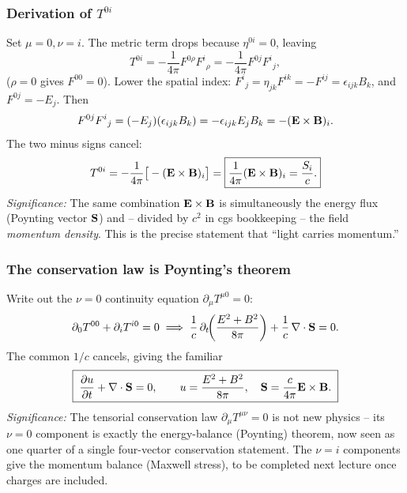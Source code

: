 
\subsubsection*{Derivation of $T^{0i}$}
Set $\mu=0,\nu=i$. The metric term drops because $\eta^{0i}=0$, leaving
\begin{equation}\label{eq:lec23:T0i-step1}
  T^{0i}=-\frac{1}{4\pi}F^{0\rho}F^{i}{}_{\rho}
        =-\frac{1}{4\pi}F^{0j}F^{i}{}_{j},
\end{equation}
($\rho=0$ gives $F^{00}=0$). Lower the spatial index:
$F^{i}{}_{j}=\eta_{jk}F^{ik}=-F^{ij}=\epsilon_{ijk}B_k$, and $F^{0j}=-E_j$. Then
\begin{equation}\label{eq:lec23:T0i-step2}
  F^{0j}F^{i}{}_{j}=(-E_j)(\epsilon_{ijk}B_k)
                  =-\epsilon_{ijk}E_jB_k=-(\mathbf{E}\times\mathbf{B})_i .
\end{equation}
The two minus signs cancel:
\begin{equation}\label{eq:lec23:T0i-final}
  T^{0i}=-\frac{1}{4\pi}\big[-(\mathbf{E}\times\mathbf{B})_i\big]
        =\boxed{\frac{1}{4\pi}(\mathbf{E}\times\mathbf{B})_i=\frac{S_i}{c}.}
\end{equation}
\textit{Significance:} The same combination $\mathbf{E}\times\mathbf{B}$ is simultaneously the energy
flux (Poynting vector $\mathbf{S}$) and -- divided by $c^2$ in cgs bookkeeping -- the field
\emph{momentum density}. This is the precise statement that ``light carries momentum.''

\subsubsection*{The conservation law is Poynting's theorem}
Write out the $\nu=0$ continuity equation $\partial_\mu T^{\mu0}=0$:
\begin{equation}\label{eq:lec23:poynting-thm}
  \partial_0 T^{00}+\partial_i T^{i0}=0
  \;\Longrightarrow\;
  \frac1c\,\partial_t\!\qty(\frac{E^2+B^2}{8\pi})
  +\frac1c\,\nabla \cdot\mathbf{S}=0 .
\end{equation}
The common $1/c$ cancels, giving the familiar
\begin{equation}\label{eq:lec23:poynting-final}
  \boxed{\;\pdv{u}{t}+\nabla \cdot\mathbf{S}=0,\qquad u=\frac{E^2+B^2}{8\pi},
   \quad \mathbf{S}=\frac{c}{4\pi}\mathbf{E}\times\mathbf{B} .\;}
\end{equation}
\textit{Significance:} The tensorial conservation law $\partial_\mu T^{\mu\nu}=0$ is not new
physics -- its $\nu=0$ component is exactly the energy-balance (Poynting) theorem, now seen
as one quarter of a single four-vector conservation statement. The $\nu=i$ components give
the momentum balance (Maxwell stress), to be completed next lecture once charges are
included.

